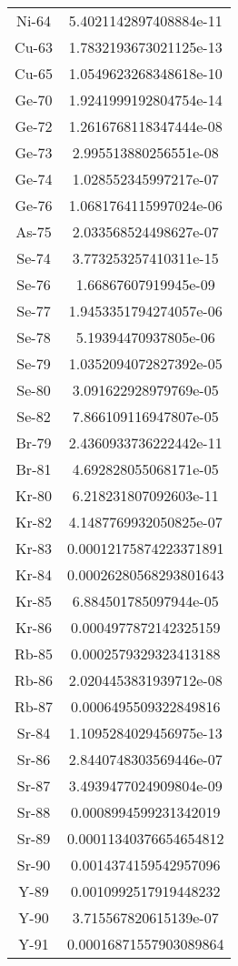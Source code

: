 \begin{table}[h!]
\begin{tabular}{|| c || c |}
Ni-64 & 5.4021142897408884e-11 \\
Cu-63 & 1.7832193673021125e-13 \\
Cu-65 & 1.0549623268348618e-10 \\
Ge-70 & 1.9241999192804754e-14 \\
Ge-72 & 1.2616768118347444e-08 \\
Ge-73 & 2.995513880256551e-08 \\
Ge-74 & 1.028552345997217e-07 \\
Ge-76 & 1.0681764115997024e-06 \\
As-75 & 2.033568524498627e-07 \\
Se-74 & 3.773253257410311e-15 \\
Se-76 & 1.66867607919945e-09 \\
Se-77 & 1.9453351794274057e-06 \\
Se-78 & 5.19394470937805e-06 \\
Se-79 & 1.0352094072827392e-05 \\
Se-80 & 3.091622928979769e-05 \\
Se-82 & 7.866109116947807e-05 \\
Br-79 & 2.4360933736222442e-11 \\
Br-81 & 4.692828055068171e-05 \\
Kr-80 & 6.218231807092603e-11 \\
Kr-82 & 4.1487769932050825e-07 \\
Kr-83 & 0.00012175874223371891 \\
Kr-84 & 0.00026280568293801643 \\
Kr-85 & 6.884501785097944e-05 \\
Kr-86 & 0.0004977872142325159 \\
Rb-85 & 0.0002579329323413188 \\
Rb-86 & 2.0204453831939712e-08 \\
Rb-87 & 0.0006495509322849816 \\
Sr-84 & 1.1095284029456975e-13 \\
Sr-86 & 2.8440748303569446e-07 \\
Sr-87 & 3.4939477024909804e-09 \\
Sr-88 & 0.0008994599231342019 \\
Sr-89 & 0.00011340376654654812 \\
Sr-90 & 0.0014374159542957096 \\
Y-89 & 0.0010992517919448232 \\
Y-90 & 3.715567820615139e-07 \\
Y-91 & 0.00016871557903089864 \\

\end{tabular}
\end{table}
